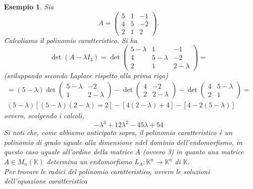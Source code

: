 \documentclass{book}
\newtheorem{esempio}{Esempio}[section]
\begin{document}
\begin{esempio}
  \label{es:5.2.2.}
  Sia
  \begin{equation*}
    A=
    \begin{pmatrix}
      5 &1 &-1\\
      4 & 5 & -2\\
      2 & 1 & 2
    \end{pmatrix}.
  \end{equation*}
  Calcoliamo il polinomio caratteristico. Si ha
  \begin{equation*}
    \det(A-\lambda I_3)=\det
    \begin{pmatrix}
      5-\lambda & 1 & -1 \\
      4 & 5-\lambda & -2\\
      2 & 1 & 2-\lambda 
    \end{pmatrix}=
  \end{equation*}
  (sviluppando secondo Laplace rispetto alla prima riga)
  \begin{eqnarray*}
    =(5-\lambda) \det
    \begin{pmatrix}
      5-\lambda & -2\\
      1 & 2 -\lambda
    \end{pmatrix}-\det
    \begin{pmatrix}
      4 &-2\\
      2 & 2-\lambda
    \end{pmatrix}-\det
    \begin{pmatrix}
      4 &5 -\lambda \\
      2 &1
    \end{pmatrix}=\\
    (5-\lambda)[(5-\lambda)(2-\lambda)=2]-[4(2-\lambda)+4]-[4-2(5-\lambda)]
  \end{eqnarray*}
  ovvero, svolgendo i calcoli,
  \begin{equation*}
    -\lambda^3+12\lambda^2-45\lambda+54
  \end{equation*}
  Si noti che, come abbiamo anticipato sopra, il polinomio caratteristico è un polinomio di grado uguale alla
  dimensione ndel dominio dell'endomorfismo, in questo caso uguale all'ordine della matrice $A$ (ovvero 3) in
  quanto una matrice $A\in M_n(\mathds{K})$ determina un endomorfismo $L_A:\mathds{K}^n\to \mathds{K}^n$ di
  $\mathds{K}$.\\
  Per trovare le \textit{radici} del polinomio caratteristico, ovvero le soluzioni dell'equazione caratteristica
  \begin{equation}
    \label{eq:5.8}

\end{equation}
\end{esempio}
\end{document}
